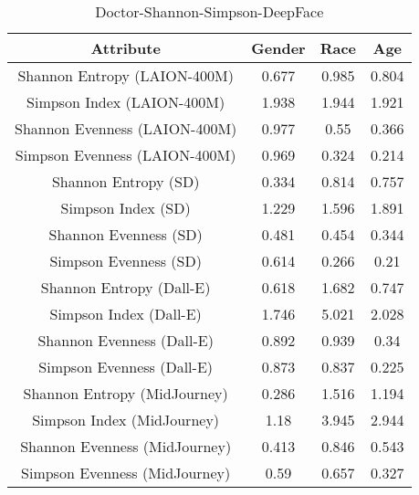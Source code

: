 \begin{table}[h]
\centering
\begin{tabular}{|c|c|c|c|}
\hline 
Attribute & Gender & Race & Age\\
\hline
Shannon Entropy (LAION-400M) & 0.677  &  0.985  &  0.804 \\
Simpson Index (LAION-400M) & 1.938  &  1.944  &  1.921 \\
Shannon Evenness (LAION-400M) & 0.977  &  0.55  &  0.366 \\
Simpson Evenness (LAION-400M) & 0.969  &  0.324  &  0.214 \\
\hline
Shannon Entropy (SD) & 0.334  &  0.814  &  0.757 \\
Simpson Index (SD) & 1.229  &  1.596  &  1.891 \\
Shannon Evenness (SD) & 0.481  &  0.454  &  0.344 \\
Simpson Evenness (SD) & 0.614  &  0.266  &  0.21 \\
\hline 
Shannon Entropy (Dall-E) & 0.618  &  1.682  &  0.747 \\
Simpson Index (Dall-E) & 1.746  &  5.021  &  2.028 \\
Shannon Evenness (Dall-E) & 0.892  &  0.939  &  0.34 \\
Simpson Evenness (Dall-E) & 0.873  &  0.837  &  0.225 \\
\hline 
Shannon Entropy (MidJourney) & 0.286  &  1.516  &  1.194 \\
Simpson Index (MidJourney) & 1.18  &  3.945  &  2.944 \\
Shannon Evenness (MidJourney) & 0.413  &  0.846  &  0.543 \\
Simpson Evenness (MidJourney) & 0.59  &  0.657  &  0.327 \\
\hline
\end{tabular}
\caption{Doctor-Shannon-Simpson-DeepFace}
\label{tab:doctor-shannon-simpson-deepFace}
\end{table}

